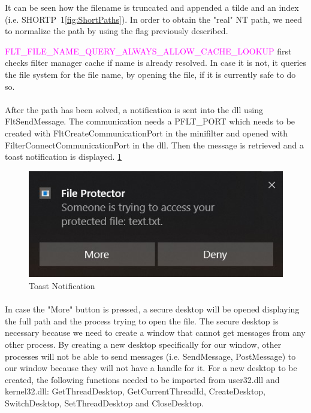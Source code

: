 		It can be seen how the filename is truncated and appended a tilde and an index (i.e. SHORTP~1\ref{fig:ShortPaths}). In order to obtain the "real" NT path, we need to normalize the path by using the flag previously described.
		
		\textcolor{magenta}{FLT\_FILE\_NAME\_QUERY\_ALWAYS\_ALLOW\_CACHE\_LOOKUP} first checks filter manager cache if name is already resolved. In case it is not, it queries the file system for the file name, by opening the file, if it is currently safe to do so.
		
		\paragraph{}
		After the path has been solved, a notification is sent into the dll using FltSendMessage. The communication needs a \textcolor{Emerald}{PFLT\_PORT} which needs to be created with FltCreateCommunicationPort in the minifilter and opened with FilterConnectCommunicationPort in the dll. Then the message is retrieved and a toast notification is displayed. \ref{fig:ToastNotification}
		
		\begin{figure}[h!]
			\begin{center}
				\includegraphics{images/ToastNotification.jpg}
				\caption{Toast Notification}
				\label{fig:ToastNotification}
			\end{center}
		\end{figure}
	
		\paragraph{}
		In case the "More" button is pressed, a secure desktop will be opened displaying the full path and the process trying to open the file. The secure desktop is necessary because we need to create a window that cannot get messages from any other process. By creating a new desktop specifically for our window, other processes will not be able to send messages (i.e. SendMessage, PostMessage) to our window because they will not have a handle for it. For a new desktop to be created, the following functions needed to be imported from user32.dll and kernel32.dll: GetThreadDesktop, GetCurrentThreadId, CreateDesktop, SwitchDesktop, SetThreadDesktop and CloseDesktop. 
		

